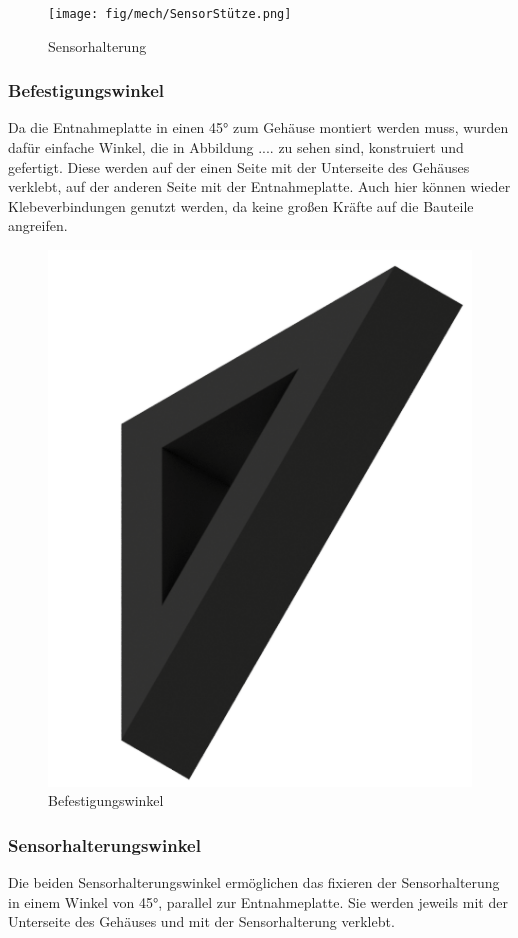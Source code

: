 \begin{figure}
    \centering
    \texttt{[image: fig/mech/SensorStütze.png]}
    \caption{Sensorhalterung}
\end{figure}

\subsubsection{Befestigungswinkel}
Da die Entnahmeplatte  in einen 45° zum Gehäuse montiert werden muss, wurden dafür einfache Winkel, die in Abbildung .... zu sehen sind, konstruiert und gefertigt.
Diese werden auf der einen Seite mit der Unterseite des Gehäuses verklebt, auf der anderen Seite mit der Entnahmeplatte.
Auch hier können wieder Klebeverbindungen genutzt werden, da keine großen Kräfte auf die Bauteile angreifen.

\begin{figure}
    \centering
    \includegraphics[scale=0.5,page=1]{fig/mech/Winkel.png}
    \caption{Befestigungswinkel}
\end{figure}

\subsubsection{Sensorhalterungswinkel}
Die beiden Sensorhalterungswinkel ermöglichen das fixieren der Sensorhalterung in einem Winkel von 45°, parallel zur
Entnahmeplatte. Sie werden jeweils mit der Unterseite des Gehäuses und mit der Sensorhalterung verklebt.

